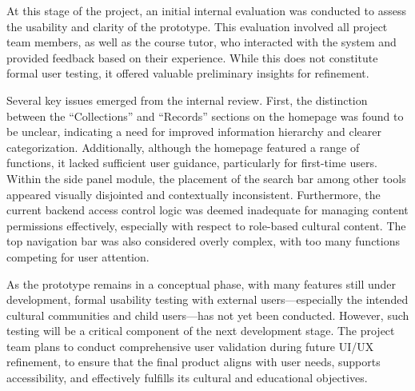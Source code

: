 ﻿%


At this stage of the project, an initial internal evaluation was conducted to assess the usability and clarity of the prototype. This evaluation involved all project team members, as well as the course tutor, who interacted with the system and provided feedback based on their experience. While this does not constitute formal user testing, it offered valuable preliminary insights for refinement.

Several key issues emerged from the internal review. First, the distinction between the “Collections” and “Records” sections on the homepage was found to be unclear, indicating a need for improved information hierarchy and clearer categorization. Additionally, although the homepage featured a range of functions, it lacked sufficient user guidance, particularly for first-time users. Within the side panel module, the placement of the search bar among other tools appeared visually disjointed and contextually inconsistent. Furthermore, the current backend access control logic was deemed inadequate for managing content permissions effectively, especially with respect to role-based cultural content. The top navigation bar was also considered overly complex, with too many functions competing for user attention.

As the prototype remains in a conceptual phase, with many features still under development, formal usability testing with external users—especially the intended cultural communities and child users—has not yet been conducted. However, such testing will be a critical component of the next development stage. The project team plans to conduct comprehensive user validation during future UI/UX refinement, to ensure that the final product aligns with user needs, supports accessibility, and effectively fulfills its cultural and educational objectives.